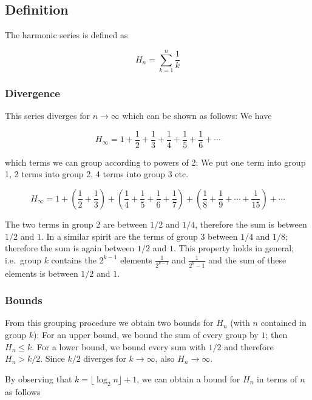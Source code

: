 
\subsection{Definition}

The harmonic series is defined as

\[
H_n  = \sum_{k=1}^n \frac{1}{k}
\]

\subsubsection{Divergence}

This series diverges for \(n \rightarrow \infty\) which can be shown as follows: We have

\[
H_\infty = 1 + \frac{1}{2} + \frac{1}{3} + \frac{1}{4} + \frac{1}{5} + \frac{1}{6} + \cdots
\]

which terms we can group according to powers of 2: We put one term into group 1, 2 terms into group 2, 4 terms into group 3 etc.

\[
H_\infty = 1 + \left( \frac{1}{2} + \frac{1}{3} \right) + \left( \frac{1}{4} + \frac{1}{5} + \frac{1}{6} + \frac{1}{7} \right) +  \left( \frac{1}{8} + \frac{1}{9} + \cdots + \frac{1}{15} \right) + \cdots
\]

The two terms in group 2 are between \(1/2\) and \(1/4\), therefore the sum is between \(1/2\) and \(1\). In a similar spirit are the terms of group 3 between \(1/4\) and \(1/8\); therefore the sum is again between \(1/2\) and \(1\). This property holds in general; i.e.~group \(k\) contains the \(2^{k-1}\) elements \(\frac{1}{2^{k-1}}\) and
\(\frac{1}{2^k - 1}\) and the sum of these elements is between \(1/2\) and \(1\).

\subsubsection{Bounds}

From this grouping procedure we obtain two bounds for \(H_n\) (with \(n\) contained in group \(k\)): For an upper bound, we bound the sum of every group by \(1\); then \(H_n \leq k\). For a lower bound, we bound every sum with \(1/2\) and therefore \(H_n > k/2\). Since \(k/2\) diverges for \(k \rightarrow \infty\), also \(H_n \rightarrow \infty\).

By observing that \(k = \lfloor \log_2 n \rfloor + 1\), we can obtain a bound for \(H_n\) in terms of \(n\) as follows

